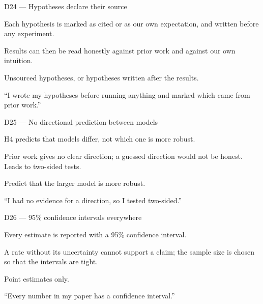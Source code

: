 \documentclass[11pt,a4paper]{report}
\begin{document}
\begin{decisionbox}{D24 --- Hypotheses declare their source}
\begin{description}[nosep, leftmargin=0pt]
  \item[Decision.] Each hypothesis is marked as cited or as our own
    expectation, and written before any experiment.
  \item[Why.] Results can then be read honestly against prior work and
    against our own intuition.
  \item[Alternatives.] Unsourced hypotheses, or hypotheses written after
    the results.
  \item[Interview line.] ``I wrote my hypotheses before running anything
    and marked which came from prior work.''
\end{description}
\end{decisionbox}

\begin{decisionbox}{D25 --- No directional prediction between models}
\begin{description}[nosep, leftmargin=0pt]
  \item[Decision.] H4 predicts that models differ, not which one is more
    robust.
  \item[Why.] Prior work gives no clear direction; a guessed direction
    would not be honest. Leads to two-sided tests.
  \item[Alternatives.] Predict that the larger model is more robust.
  \item[Interview line.] ``I had no evidence for a direction, so I tested
    two-sided.''
\end{description}
\end{decisionbox}

\begin{decisionbox}{D26 --- 95\% confidence intervals everywhere}
\begin{description}[nosep, leftmargin=0pt]
  \item[Decision.] Every estimate is reported with a 95\% confidence
    interval.
  \item[Why.] A rate without its uncertainty cannot support a claim; the
    sample size is chosen so that the intervals are tight.
  \item[Alternatives.] Point estimates only.
  \item[Interview line.] ``Every number in my paper has a confidence
    interval.''
\end{description}
\end{decisionbox}
\end{document}
